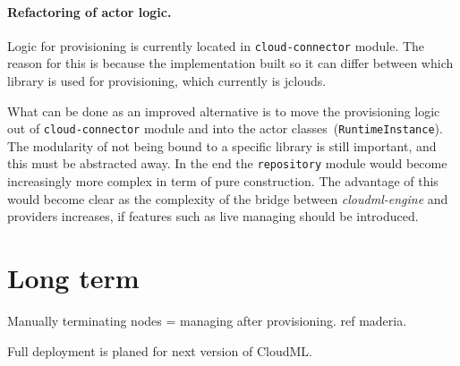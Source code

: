 \paragraph{Refactoring of actor logic.}

Logic for provisioning is currently located in \texttt{cloud-connector} module.
The reason for this is because the implementation built so it can differ between which library is used for provisioning, 
which currently is jclouds.

What can be done as an improved alternative is to move the provisioning logic out of \texttt{cloud-connector} 
module and into the actor classes~(\texttt{RuntimeInstance}).
The modularity of not being bound to a specific library is still important, and this must be abstracted away.
In the end the \texttt{repository} module would become increasingly more complex in term of pure construction.
The advantage of this would become clear as the complexity of the bridge between \emph{cloudml-engine}
and providers increases, \eg if features such as live managing should be introduced.

\section{Long term}

Manually terminating nodes = managing after provisioning.
ref maderia.

Full deployment is planed for next version of CloudML.


